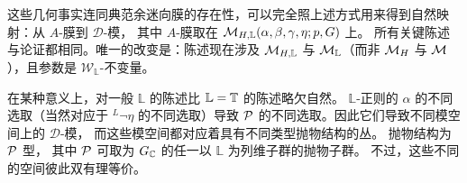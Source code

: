 这些几何事实连同典范余迷向膜的存在性，可以完全照上述方式用来得到自然映射：从 $A$-膜到 ${\mathcal D}$-模，
其中 $A$-膜取在 ${\mathcal{M}}_{H,\mathbb{L}}(\alpha,\beta,\gamma,\eta;p,G)$ 上。
所有关键陈述与论证都相同。唯一的改变是：陈述现在涉及 ${\mathcal{M}}_{H,\mathbb{L}}$ 与 ${\mathcal{M}}_\mathbb{L}$（而非
${{\mathcal{M}}_H}$ 与 ${\mathcal{M}}$），且参数是 ${\mathcal W}_\mathbb{L}$-不变量。

在某种意义上，对一般 $\mathbb{L}$ 的陈述比
$\mathbb{L}={\mathbb{T}}$ 的陈述略欠自然。
$\mathbb{L}$-正则的 $\alpha$ 的不同选取（当然对应于
$^L\neg\eta$ 的不同选取）导致
$\mathcal{P}$ 的不同选取。因此它们导致不同模空间上的 ${\mathcal D}$-模，
而这些模空间都对应着具有不同类型抛物结构的丛。
抛物结构为 $\mathcal{P}$ 型，
其中 $\mathcal{P}$ 可取为 $G_{\mathbb{C}}$ 的任一以 $\mathbb{L}$ 为列维子群的抛物子群。
不过，这些不同的空间彼此双有理等价。
